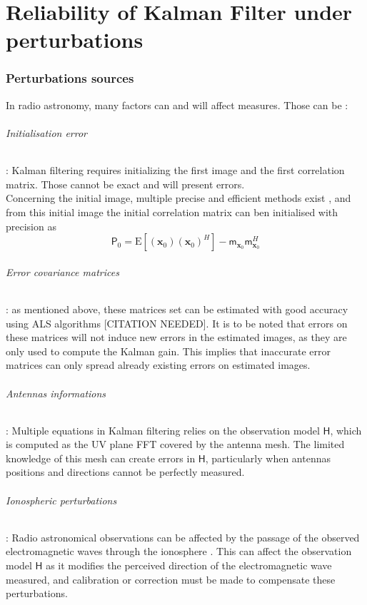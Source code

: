 \documentclass[titlepage]{article}
\newcommand{\moy}[1]{\boldsymbol{\mathsf{m}}_{#1}}
\newcommand{\autocorr}[1]{\expval{(#1)(#1)^H}}
\renewcommand{\expval}[1]{\text{E}\left[#1\right]}
\renewcommand{\H}{\boldsymbol{\mathsf{H}}}
\newcommand{\x}{\boldsymbol{x}}
\renewcommand{\P}{\boldsymbol{\mathsf{P}}}
\begin{document}
	
	\newpage
	\part{Reliability of Kalman Filter under perturbations}
	\section{Perturbations sources}
	
	In radio astronomy, many factors can and will affect measures. Those can be :
	\paragraph{Initialisation error} : Kalman filtering requires initializing the first image and the first correlation matrix. Those cannot be exact and will present errors. \\
	Concerning the initial image, multiple precise and efficient methods exist \cite{bible}, and from this initial image the initial correlation matrix can ben initialised\cite{intro_KF} with precision as 
	\begin{equation}\label{p0}
		\P_0 = \autocorr{\x_0} - \moy{\x_0}\moy{\x_0}^H
	\end{equation}
	
	\paragraph{Error covariance matrices} : as mentioned above, these matrices set can be estimated with good accuracy using ALS algorithms [CITATION NEEDED]. It is to be noted that errors on these matrices will not induce new errors in the estimated images, as they are only used to compute the Kalman gain. This implies that inaccurate error matrices can only spread already existing errors on estimated images.
	
	\paragraph{Antennas informations} : Multiple equations in Kalman filtering relies on the observation model $\H$, which is computed as the UV plane FFT covered by the antenna mesh. The limited knowledge of this mesh can create errors in $\H$, particularly when antennas positions and directions cannot be perfectly measured.
	
	\paragraph{Ionospheric perturbations} : Radio astronomical observations can be affected by the passage of the observed electromagnetic waves through the ionosphere \cite{iono}. This can affect the observation model $\H$ as it modifies the perceived direction of the electromagnetic wave measured, and calibration or correction must be made to compensate these perturbations.
	
\end{document}

